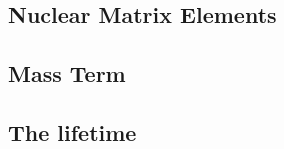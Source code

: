 \subsection{Nuclear Matrix Elements}
\begin{comment}
Explain the NME - discuss different methods of calculation - QRPA, shell model, IBM, pairing
discuss uncertainties
discuss nuclear physics information that could help pin them down?
\end{comment}


\subsection{Mass Term}
\begin{comment}
Explain the mass term
\end{comment}


\subsection{The lifetime}
\begin{comment}
Discuss some different experiments working on \zvbb and the limits that are currently se on lifetimes and the expected limit for next-generation experiments.
\end{comment}

%
% 
% 
